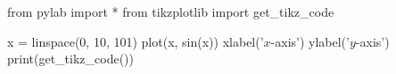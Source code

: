 \documentclass{article}
\begin{document}
\begin{pycode}
from pylab import *
from tikzplotlib import get_tikz_code
\end{pycode}

\begin{pycode}
x = linspace(0, 10, 101)
plot(x, sin(x))
xlabel('$x$-axis')
ylabel('$y$-axis')
print(get_tikz_code())
\end{pycode}
\end{document}
